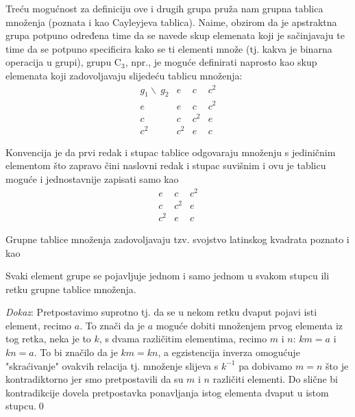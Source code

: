 Treću mogućnost za definiciju ove i drugih grupa pruža nam grupna tablica množenja
(poznata i kao Cayleyjeva tablica).
Naime, obzirom da je apstraktna grupa potpuno određena time da se navede
skup elemenata koji je sačinjavaju te time da se potpuno specificira kako
se ti elementi množe (tj. kakva je binarna operacija u grupi), grupu C$_3$, npr.,
je moguće definirati naprosto kao skup elemenata koji zadovoljavaju slijedeću tablicu
množenja:  
\vspace{1ex}
\begin{equation}
\begin{array}{c|ccc}
g_1\backslash\ g_2 & e & c & c^2 \\ \hline
   e    & e & c & c^2 \\
   c    & c & c^2 & e \\
   c^2    & c^2 & e & c
\end{array}
\label{eq:cntab}
\end{equation}

Konvencija je da prvi redak i stupac tablice odgovaraju množenju
s jediničnim elementom što zapravo čini naslovni redak i stupac
suvišnim i ovu je tablicu moguće i jednostavnije zapisati samo kao
\vspace{1ex}
\begin{equation}
\begin{array}{|ccc}
 \hline
 e & c & c^2 \\
 c & c^2 & e \\
 c^2 & e & c
\end{array}
\label{eq:cntabsimple}
\end{equation}

Grupne tablice množenja zadovoljavaju tzv. svojstvo latinskog
kvadrata poznato i kao  
\begin{teorem}
Svaki element grupe se pojavljuje jednom i samo jednom u svakom stupcu
ili retku grupne tablice množenja.
\end{teorem}

\emph{Dokaz}: Pretpostavimo suprotno tj. da se u nekom retku
dvaput pojavi isti element, recimo $a$. To znači da je $a$ moguće
dobiti množenjem prvog elementa iz tog retka, neka je to $k$, s
dvama različitim elementima, recimo $m$ i $n$: $km=a$ i $kn=a$. To bi značilo
da je $km=kn$, a egzistencija inverza omogućuje "skraćivanje"
ovakvih relacija tj. množenje slijeva s $k^{-1}$ pa
dobivamo $m=n$ što je kontradiktorno jer smo pretpostavili da su
$m$ i $n$ različiti elementi. Do slične bi kontradikcije dovela
pretpostavka  ponavljanja istog elementa dvaput u istom stupcu.\qed

